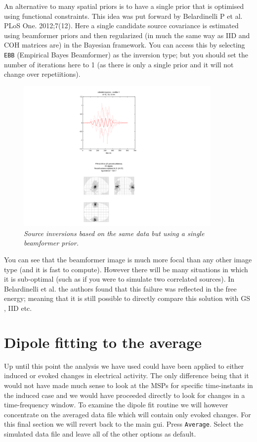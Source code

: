 An alternative to many spatial priors is to have a single prior that is optimised using functional constraints. This idea was put forward by Belardinelli P et al. PLoS One. 2012;7(12). Here a single candidate source covariance is estimated using beamformer priors and then regularized (in much the same way as IID and COH matrices are) in the Bayesian framework. You can access this by selecting \texttt{EBB} (Empirical Bayes Beamformer) as the inversion type; but you should set the number of iterations here to 1 (as there is only a single prior and it will not change over repetiitions).

\begin{figure}
\begin{center}
\includegraphics[width=100mm]{meg_sloc/slide9}
\caption{\em  Source inversions based on the same data but using a single beamformer prior.\label{meg_sloc:fig:9}}
\end{center}
\end{figure}

You can see that the beamformer image is much more focal than any other image type (and it is fast to compute). However there will be many situations in which it is sub-optimal (such as if you were to simulate two correlated sources). In Belardinelli et al. the authors found that this failure was reflected in the free energy; meaning that it is still possible to directly compare this solution with GS , IID etc.



\section{Dipole fitting to the average}

 Up until this point the analysis we have used could have been applied to either induced or evoked changes in electrical activity. The only difference being that it would not have made much sense to look at the MSPs for specific time-instants in the induced case and we would have proceeded directly to look for changes in a time-frequency window. To examine the dipole fit routine we will however concentrate on the averaged data file which will contain only evoked changes. 
For this final section we will revert back to the main gui.
Press  \texttt{Average}. Select the simulated data file and leave all of the other options as default.


